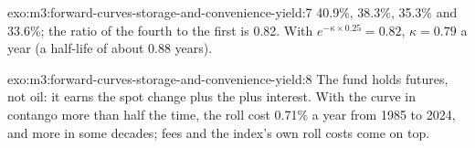 \begin{solution}{exo:m3:forward-curves-storage-and-convenience-yield:7}
40.9\%, 38.3\%, 35.3\% and 33.6\%; the ratio of the fourth to the first is 0.82. With $e^{-\kappa \times
0.25} = 0.82$, $\kappa = 0.79$ a year (a half-life of about 0.88 years).
\end{solution}

\begin{solution}{exo:m3:forward-curves-storage-and-convenience-yield:8}
The fund holds futures, not oil: it earns the spot change plus the  plus interest. With the
curve in contango more than half the time, the roll cost 0.71\% a year from 1985 to 2024, and more in
some decades; fees and the index's own roll costs come on top.
\end{solution}

